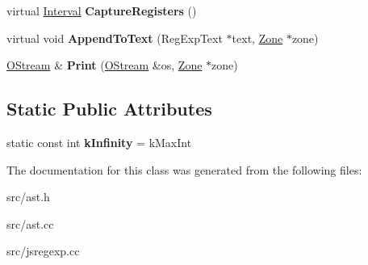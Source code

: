 \begin{DoxyCompactItemize}
\item 
\hypertarget{classv8_1_1internal_1_1_reg_exp_tree_ac9eaff84346b534c7617bfaf99fe277f}{}virtual \hyperlink{classv8_1_1internal_1_1_interval}{Interval} {\bfseries Capture\+Registers} ()\label{classv8_1_1internal_1_1_reg_exp_tree_ac9eaff84346b534c7617bfaf99fe277f}

\item 
\hypertarget{classv8_1_1internal_1_1_reg_exp_tree_a703a7d343de906a8a76dadc11907d6cc}{}virtual void {\bfseries Append\+To\+Text} (Reg\+Exp\+Text $\ast$text, \hyperlink{classv8_1_1internal_1_1_zone}{Zone} $\ast$zone)\label{classv8_1_1internal_1_1_reg_exp_tree_a703a7d343de906a8a76dadc11907d6cc}

\item 
\hypertarget{classv8_1_1internal_1_1_reg_exp_tree_a3cec9fca065c181a99e73097665098dd}{}\hyperlink{classv8_1_1internal_1_1_o_stream}{O\+Stream} \& {\bfseries Print} (\hyperlink{classv8_1_1internal_1_1_o_stream}{O\+Stream} \&os, \hyperlink{classv8_1_1internal_1_1_zone}{Zone} $\ast$zone)\label{classv8_1_1internal_1_1_reg_exp_tree_a3cec9fca065c181a99e73097665098dd}

\end{DoxyCompactItemize}
\subsection*{Static Public Attributes}
\begin{DoxyCompactItemize}
\item 
\hypertarget{classv8_1_1internal_1_1_reg_exp_tree_a91c43a4c99efe5ac1ec0db20eff0a1f3}{}static const int {\bfseries k\+Infinity} = k\+Max\+Int\label{classv8_1_1internal_1_1_reg_exp_tree_a91c43a4c99efe5ac1ec0db20eff0a1f3}

\end{DoxyCompactItemize}


The documentation for this class was generated from the following files\+:\begin{DoxyCompactItemize}
\item 
src/ast.\+h\item 
src/ast.\+cc\item 
src/jsregexp.\+cc\end{DoxyCompactItemize}
